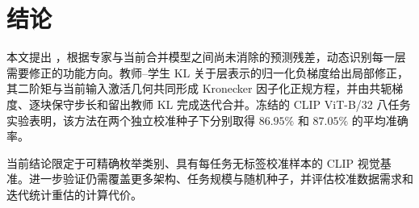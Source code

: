 \section{结论}
\label{sec:ink-conclusion}

本文提出 \method{}，根据专家与当前合并模型之间尚未消除的预测残差，动态识别每一层需要修正的功能方向。教师--学生 KL 关于层表示的归一化负梯度给出局部修正，其二阶矩与当前输入激活几何共同形成 Kronecker 因子化正规方程，并由共轭梯度、逐块保守步长和留出教师 KL 完成迭代合并。冻结的 CLIP ViT-B/32 八任务实验表明，该方法在两个独立校准种子下分别取得 $86.95\%$ 和 $87.05\%$ 的平均准确率。

当前结论限定于可精确枚举类别、具有每任务无标签校准样本的 CLIP 视觉基准。进一步验证仍需覆盖更多架构、任务规模与随机种子，并评估校准数据需求和迭代统计重估的计算代价。
